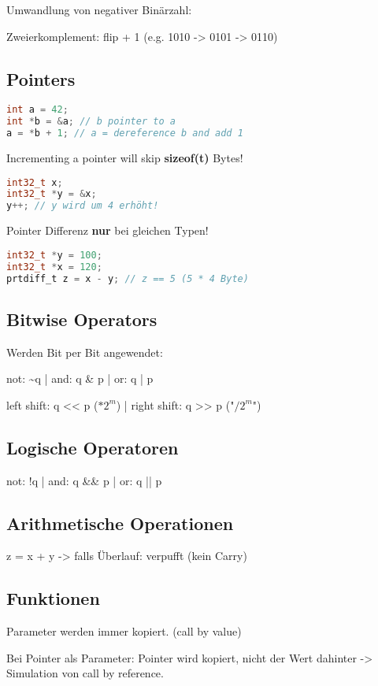 \begin{multicols*}{4}
Umwandlung von negativer Binärzahl:

Zweierkomplement: flip + 1 (e.g. 1010 -> 0101 -> 0110)

\subsection{Pointers}

\begin{lstlisting}[language=c]
int a = 42;
int *b = &a; // b pointer to a
a = *b + 1; // a = dereference b and add 1
\end{lstlisting}
Incrementing a pointer will skip \textbf{sizeof(t)} Bytes!
\begin{lstlisting}[language=c]
int32_t x;
int32_t *y = &x;
y++; // y wird um 4 erhöht!
\end{lstlisting}
\vspace{2pt}
Pointer Differenz \textbf{nur} bei gleichen Typen!
\begin{lstlisting}[language=c]
int32_t *y = 100;
int32_t *x = 120;
prtdiff_t z = x - y; // z == 5 (5 * 4 Byte)
\end{lstlisting}

\subsection{Bitwise Operators}
Werden Bit per Bit angewendet:

not: \~{}q | and: q \& p | or: q | p

left shift: q << p (\(* 2^m\)) | right shift: q >> p ("\(/ 2^m\)")
\subsection{Logische Operatoren}
not: !q | and: q \&\& p | or: q || p

\subsection{Arithmetische Operationen}
z = x + y -> falls Überlauf: verpufft (kein Carry)

\subsection{Funktionen}
Parameter werden immer kopiert. (call by value)\vspace{2pt}

Bei Pointer als Parameter: Pointer wird kopiert, nicht der Wert dahinter -> Simulation von call by reference.\vspace{2pt}


\end{multicols*}

